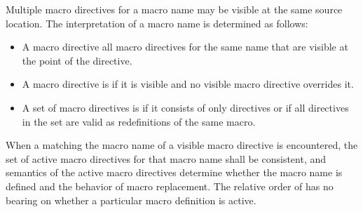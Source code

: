 \begin{std.txt}
\alinea
Multiple macro directives for a macro name may be visible at the same
source location.
The interpretation of a macro name is determined as follows:
\begin{itemize}
\item
\color{addclr}
A macro directive  all macro directives for the same name
that are visible at the point of the directive.
\item
\color{addclr}
A macro directive is  if it is visible and
no visible macro directive overrides it.
\item
\color{addclr}
A set of macro directives is  if it consists of only
 directives or if all  directives in the set
are valid as redefinitions of the same macro.
\end{itemize}
\color{addclr}
When a  matching the macro name of a visible
macro directive is encountered, the set of active macro directives for that
macro name shall be consistent, and semantics of the active macro directives
determine whether the macro name is defined and the behavior of macro
replacement.
\enternote
The relative order of  has no bearing on whether a
particular macro definition is active.
\exitnote
\end{std.txt}
